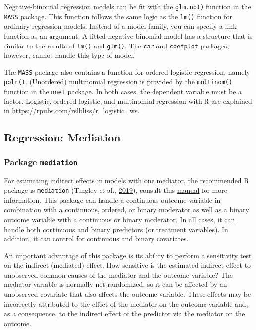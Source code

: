 \documentclass[doc,floatsintext]{apa6}
\begin{document}
Negative-binomial regression models can be fit with the
\texttt{glm.nb()} function in the \texttt{MASS} package. This function
follows the same logic as the \texttt{lm()} function for ordinary
regression models. Instead of a model family, you can specify a link
function as an argument. A fitted negative-binomial model has a
structure that is similar to the results of \texttt{lm()} and
\texttt{glm()}. The \texttt{car} and \texttt{coefplot} packages,
however, cannot handle this type of model.

The \texttt{MASS} package also contains a function for ordered logistic
regression, namely \texttt{polr()}. (Unordered) multinomial regression
is provided by the \texttt{multinom()} function in the \texttt{nnet}
package. In both cases, the dependent variable must be a factor.
Logistic, ordered logistic, and multinomial regression with R are
explained in \url{https://rpubs.com/rslbliss/r_logistic_ws}.

\subsection{Regression: Mediation}\label{regression-mediation}

\subsubsection{\texorpdfstring{Package
\texttt{mediation}}{Package mediation}}\label{package-mediation}

For estimating indirect effects in models with one mediator, the
recommended R package is \texttt{mediation} (Tingley et al.,
\protect\hyperlink{ref-R-mediation}{2019}), consult this
\href{https://web.mit.edu/teppei/www/research/mediationR.pdf}{manual}
for more information. This package can handle a continuous outcome
variable in combination with a continuous, ordered, or binary moderator
as well as a binary outcome variable with a continuous or binary
moderator. In all cases, it can handle both continuous and binary
predictors (or treatment variables). In addition, it can control for
continuous and binary covariates.

An important advantage of this package is its ability to perform a
sensitivity test on the indirect (mediated) effect. How sensitive is the
estimated indirect effect to unobserved common causes of the mediator
and the outcome variable? The mediator variable is normally not
randomized, so it can be affected by an unobserved covariate that also
affects the outcome variable. These effects may be incorrectly
attributed to the effect of the mediator on the outcome variable and, as
a consequence, to the indirect effect of the predictor via the mediator
on the outcome.
\end{document}
